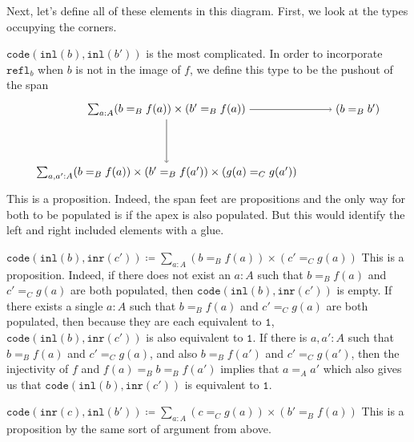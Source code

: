 \documentclass[11pt]{amsart}
\newcommand{\type}[1]{\mathtt{#1}}
\begin{document}
Next, let's define all of these elements in this diagram.  
First, we look at the types occupying the corners. 

\vspace{2em}

$\type{ code } \left( \type{ inl } ( b ) , \type{ inl } ( b' ) \right)$ is the most complicated. 
In order to incorporate $\type{ refl }_b$ when $b$ is not in the image of $f$, 
we define this type to be the pushout of the span
\[
\begin{tikzpicture}
	\node (1) at (0,2) 
		{ $ \sum_{ a : A } ( b =_B f ( a ) ) \times ( b' =_B f ( a ) )  $ };
	\node (2) at (6,2) 
		{ $ ( b =_B b' ) $ };
	\node (3) at (0,0) 
		{ $ \sum_{ a , a' : A } ( b =_B f ( a ) ) \times  (b' =_B f ( a' ) ) \times ( g ( a ) =_C g ( a' ) ) $ };
	\draw [ -> ] (1) to (2);
	\draw [ -> ] (1) to (3);
\end{tikzpicture}
\]
This is a proposition. 
Indeed, the span feet are propositions
and the only way for both to be populated
is if the apex is also populated.
But this would identify the 
left and right included elements
with a glue.

\vspace{2em}

$
\type{ code } \left( \type{ inl } ( b ) , \type{ inr } ( c' ) \right) \coloneqq
	\sum_{ a : A } ( b =_B f ( a ) ) \times ( c' =_C g ( a ) )
$
This is a proposition. 
Indeed, if there does not exist an $ a : A $ such that
$ b =_B f ( a )$ and $ c' =_C g ( a ) $
are both populated, then 
$ \type{ code } \left( \type{ inl } ( b ) , \type{ inr } ( c' ) \right) $ 
is empty. 
If there exists a single $a : A$ such that 
$ b =_B f ( a )$ and $ c' =_C g ( a ) $
are both populated, then 
because they are each equivalent to $ \type{ 1 }$,
$ \type{ code } \left( \type{ inl } ( b ) , \type{ inr } ( c' ) \right) $ 
is also equivalent to $ \type{ 1 }$.
If there is $a, a' : A$ such that
$ b =_B f ( a )$ and $ c' =_C g ( a ) $,
and also 
$ b =_B f ( a' )$ and $ c' =_C g ( a' ) $,
then the injectivity of $f$ and
$f ( a ) =_B b =_B f ( a' )$ 
implies that
$a =_A a'$
which also gives us that 
$ \type{ code } \left( \type{ inl } ( b ) , \type{ inr } ( c' ) \right) $ 
is equivalent to $ \type{ 1 }$.

\vspace{2em}

$
\type{ code } \left( \type{ inr } ( c ) , \type{ inl } ( b' ) \right) \coloneqq
	\sum_{ a : A } ( c =_C g ( a ) ) \times ( b' =_B f ( a ) )
$
This is a proposition by the same sort of argument from above.
	
\end{document}
